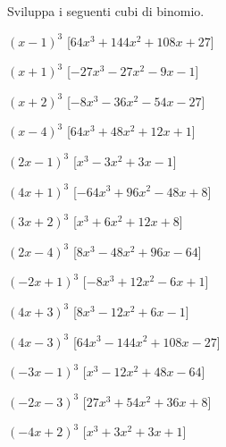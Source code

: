 \begin{esercizio}
 \label{ese:11.26}
 Sviluppa i seguenti cubi di binomio.
\begin{multicols}{2}
 \begin{enumeratea}
\item \(\left(x - 1\right)^{3}\)
  \hfill [\(64 x^{3} + 144 x^{2} + 108 x + 27\)]
\item \(\left(x + 1\right)^{3}\)
  \hfill [\(- 27 x^{3} - 27 x^{2} - 9 x - 1\)]
\item \(\left(x + 2\right)^{3}\)
  \hfill [\(- 8 x^{3} - 36 x^{2} - 54 x - 27\)]
\item \(\left(x - 4\right)^{3}\)
  \hfill [\(64 x^{3} + 48 x^{2} + 12 x + 1\)]
\item \(\left(2 x - 1\right)^{3}\)
  \hfill [\(x^{3} - 3 x^{2} + 3 x - 1\)]
\item \(\left(4 x + 1\right)^{3}\)
  \hfill [\(- 64 x^{3} + 96 x^{2} - 48 x + 8\)]
\item \(\left(3 x + 2\right)^{3}\)
  \hfill [\(x^{3} + 6 x^{2} + 12 x + 8\)]
\item \(\left(2 x - 4\right)^{3}\)
  \hfill [\(8 x^{3} - 48 x^{2} + 96 x - 64\)]
\item \(\left(- 2 x + 1\right)^{3}\)
  \hfill [\(- 8 x^{3} + 12 x^{2} - 6 x + 1\)]
\item \(\left(4 x + 3\right)^{3}\)
  \hfill [\(8 x^{3} - 12 x^{2} + 6 x - 1\)]
\item \(\left(4 x - 3\right)^{3}\)
  \hfill [\(64 x^{3} - 144 x^{2} + 108 x - 27\)]
\item \(\left(- 3 x - 1\right)^{3}\)
  \hfill [\(x^{3} - 12 x^{2} + 48 x - 64\)]
\item \(\left(- 2 x - 3\right)^{3}\)
  \hfill [\(27 x^{3} + 54 x^{2} + 36 x + 8\)]
\item \(\left(- 4 x + 2\right)^{3}\)
  \hfill [\(x^{3} + 3 x^{2} + 3 x + 1\)]

\end{enumeratea}
\end{multicols}
\end{esercizio}

